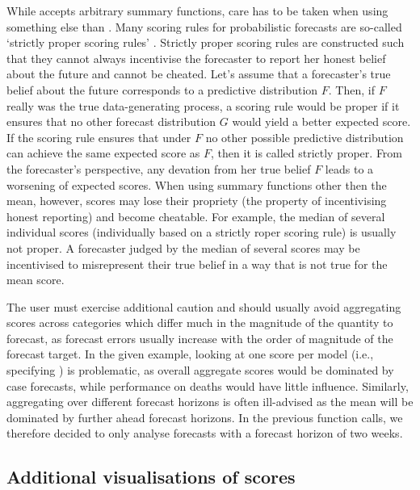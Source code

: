 \documentclass[
]{jss}
\begin{document}
While  accepts arbitrary summary functions,
care has to be taken when using something else than . Many
scoring rules for probabilistic forecasts are so-called `strictly proper
scoring rules' \citep{gneitingStrictlyProperScoring2007}. Strictly
proper scoring rules are constructed such that they cannot always
incentivise the forecaster to report her honest belief about the future
and cannot be cheated. Let's assume that a forecaster's true belief
about the future corresponds to a predictive distribution \(F\). Then,
if \(F\) really was the true data-generating process, a scoring rule
would be proper if it ensures that no other forecast distribution \(G\)
would yield a better expected score. If the scoring rule ensures that
under \(F\) no other possible predictive distribution can achieve the
same expected score as \(F\), then it is called strictly proper. From
the forecaster's perspective, any devation from her true belief \(F\)
leads to a worsening of expected scores. When using summary functions
other then the mean, however, scores may lose their propriety (the
property of incentivising honest reporting) and become cheatable. For
example, the median of several individual scores (individually based on
a strictly roper scoring rule) is usually not proper. A forecaster
judged by the median of several scores may be incentivised to
misrepresent their true belief in a way that is not true for the mean
score.

The user must exercise additional caution and should usually avoid
aggregating scores across categories which differ much in the magnitude
of the quantity to forecast, as forecast errors usually increase with
the order of magnitude of the forecast target. In the given example,
looking at one score per model (i.e., specifying
) is problematic, as overall aggregate
scores would be dominated by case forecasts, while performance on deaths
would have little influence. Similarly, aggregating over different
forecast horizons is often ill-advised as the mean will be dominated by
further ahead forecast horizons. In the previous function calls, we
therefore decided to only analyse forecasts with a forecast horizon of
two weeks.

\subsection{Additional visualisations of
scores}\label{additional-visualisations-of-scores}
\end{document}
